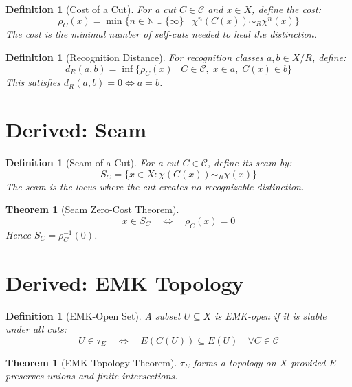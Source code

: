 \documentclass[12pt]{article}
\newtheorem{definition}[axiom]{Definition}
\newtheorem{theorem}[axiom]{Theorem}
\begin{document}
\begin{definition}[Cost of a Cut]
For a cut \(C \in \mathcal{C}\) and \(x \in X\), define the cost:
\[
\rho_C(x) = \min\{ n \in \mathbb{N} \cup \{\infty\} \mid \chi^n(C(x)) \sim_R \chi^n(x) \}
\]
The cost is the minimal number of self-cuts needed to heal the distinction.
\end{definition}

\begin{definition}[Recognition Distance]
For recognition classes \(a, b \in X/R\), define:
\[
d_R(a,b) = \inf\{ \rho_C(x) \mid C \in \mathcal{C},\; x \in a,\; C(x) \in b \}
\]
This satisfies \(d_R(a,b) = 0 \iff a = b\).
\end{definition}

\section{Derived: Seam}

\begin{definition}[Seam of a Cut]
For a cut \(C \in \mathcal{C}\), define its seam by:
\[
S_C = \{ x \in X : \chi(C(x)) \sim_R \chi(x) \}
\]
The seam is the locus where the cut creates no recognizable distinction.
\end{definition}

\begin{theorem}[Seam Zero-Cost Theorem]
\[
x \in S_C \quad\Longleftrightarrow\quad \rho_C(x) = 0
\]
Hence \(S_C = \rho_C^{-1}(0)\).
\end{theorem}

\section{Derived: EMK Topology}

\begin{definition}[EMK-Open Set]
A subset \(U \subseteq X\) is EMK-open if it is stable under all cuts:
\[
U \in \tau_E \quad\Longleftrightarrow\quad E(C(U)) \subseteq E(U) \quad \forall C \in \mathcal{C}
\]
\end{definition}

\begin{theorem}[EMK Topology Theorem]
\(\tau_E\) forms a topology on \(X\) provided \(E\) preserves unions and finite intersections.
\end{theorem}
\end{document}
